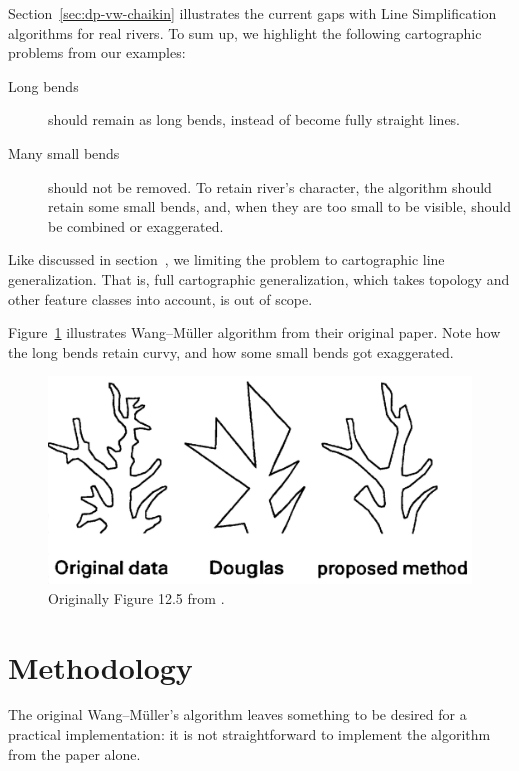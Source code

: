 \documentclass[a4paper]{article}
\newcommand{\WM}{Wang--M{\"u}ller}
\begin{document}
Section~\ref{sec:dp-vw-chaikin} illustrates the current gaps with Line
Simplification algorithms for real rivers. To sum up, we highlight the
following cartographic problems from our examples:

\begin{description}

    \item[Long bends] should remain as long bends, instead of become fully
        straight lines.

    \item[Many small bends] should not be removed. To retain river's character,
        the algorithm should retain some small bends, and, when they are too
        small to be visible, should be combined or exaggerated.

\end{description}

Like discussed in section~\label{sec:from-simplification-to-generalization}, we
limiting the problem to cartographic line generalization. That is, full
cartographic generalization, which takes topology and other feature classes
into account, is out of scope.

Figure~\ref{fig:wang125} illustrates {\WM} algorithm from their original
paper. Note how the long bends retain curvy, and how some small bends got
exaggerated.

\begin{figure}[h]
    \centering
    \includegraphics[width=.8\textwidth]{wang125}
    \caption{Originally Figure 12.5 from \cite{wang1998line}.}
    \label{fig:wang125}
\end{figure}

\section{Methodology}
\label{sec:methodology}

The original {\WM}'s algorithm \cite{wang1998line} leaves something to be
desired for a practical implementation: it is not straightforward to implement
the algorithm from the paper alone.
\end{document}
